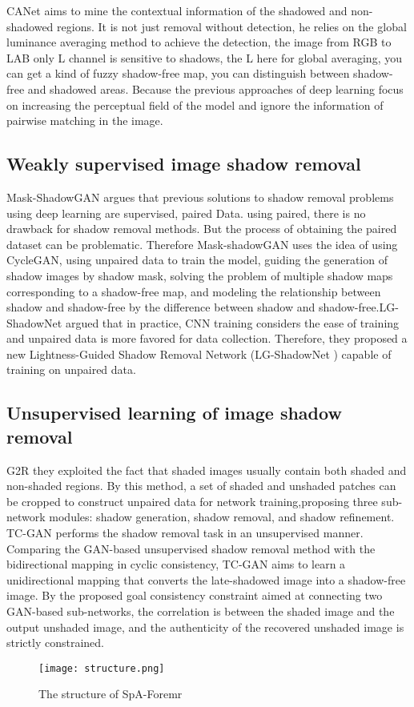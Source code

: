 \documentclass[journal]{IEEEtran}
\begin{document}
\par
CANet \cite{8} aims to mine the contextual information of the shadowed and non-shadowed regions. It is not just removal without detection, he relies on the global luminance averaging method to achieve the detection, the image from RGB to LAB only L channel is sensitive to shadows, the L here for global averaging, you can get a kind of fuzzy shadow-free map, you can distinguish between shadow-free and shadowed areas. Because the previous approaches of deep learning focus on increasing the perceptual field of the model and ignore the information of pairwise matching in the image.
\subsection{Weakly supervised image shadow removal}
Mask-ShadowGAN \cite{9} argues that previous solutions to shadow removal problems using deep learning are supervised, paired Data. using paired, there is no drawback for shadow removal methods. But the process of obtaining the paired dataset can be problematic.
Therefore Mask-shadowGAN uses the idea of using CycleGAN, using unpaired data to train the model, guiding the generation of shadow images by shadow mask, solving the problem of multiple shadow maps corresponding to a shadow-free map, and modeling the relationship between shadow and shadow-free by the difference between shadow and shadow-free.LG- ShadowNet \cite{10} argued that in practice, CNN training considers the ease of training and unpaired data is more favored for data collection. Therefore, they proposed a new Lightness-Guided Shadow Removal Network (LG-ShadowNet \cite{10}) capable of training on unpaired data.
\subsection{Unsupervised learning of image shadow removal}
G2R \cite{11} they exploited the fact that shaded images usually contain both shaded and non-shaded regions. By this method, a set of shaded and unshaded patches can be cropped to construct unpaired data for network training,proposing three sub-network modules: shadow generation, shadow removal, and shadow refinement. TC-GAN \cite{12} performs the shadow removal task in an unsupervised manner. Comparing the GAN-based unsupervised shadow removal method with the bidirectional mapping in cyclic consistency, TC-GAN aims to learn a unidirectional mapping that converts the late-shadowed image into a shadow-free image. By the proposed goal consistency constraint aimed at connecting two GAN-based sub-networks, the correlation is between the shaded image and the output unshaded image, and the authenticity of the recovered unshaded image is strictly
constrained.
\begin{figure*}
\centering
\texttt{[image: structure.png]}
\caption{The structure of SpA-Foremr }
\label{structure}
\end{figure*}
\end{document}
